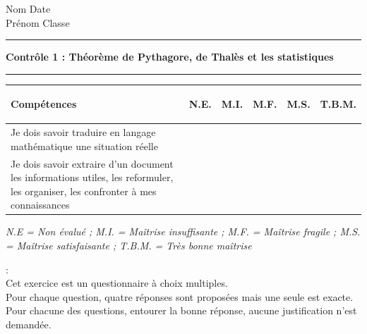 \documentclass[a4paper,11pt]{article}
\newcounter{numexo}
\newcommand{\exo}[1]{\stepcounter{numexo}\noindent{\bf Exercice~\thenumexo} : \marginpar{\hfill /#1}}
\newcommand{\titre}[5] 
{
\noindent #2 \hfill #4 \\
#3 \hfill #5

\vspace{-1.6cm}

\begin{center}\rule{6cm}{0.5mm}\end{center}
\vspace{0.2cm}
\begin{center}{\large{\textbf{#1}}}\end{center}
\begin{center}\rule{6cm}{0.5mm}\end{center}
}
\begin{document}
\pagestyle{empty}
\titre{Contrôle 1 : Théorème de Pythagore, de Thalès et les statistiques }{Nom}{Prénom}{Date}{Classe}

\begin{flushleft}
\begin{tabular}{|m{9.5cm}|m{1.25cm}|m{1.25cm}|m{1.25cm}|m{1.25cm}|m{1.25cm}|}
\hline 
\textbf{Compétences} & \begin{center}
\textbf{N.E.}
\end{center} & \begin{center}
\textbf{M.I.}
\end{center} & \begin{center}
\textbf{M.F.}
\end{center}  & \begin{center}
\textbf{M.S.}
\end{center} & \begin{center}
\textbf{T.B.M.}
\end{center} \\ 
\hline 
Je dois savoir traduire en langage mathématique une situation réelle &  &  & & &\\
\hline 
Je dois savoir extraire d'un document les informations utiles, les reformuler, les organiser, les confronter à mes connaissances &  &  & & &\\
\hline
\end{tabular} 
\end{flushleft}

\textit{N.E = Non évalué ; M.I. = Maîtrise insuffisante ; M.F. = Maîtrise fragile ; M.S. = Maîtrise satisfaisante ; T.B.M. = Très bonne maîtrise}\\


\vspace*{0.25cm}

\exo{5} \\
Cet exercice est un questionnaire à choix multiples.\\
Pour chaque question, quatre réponses sont proposées mais une seule est exacte. Pour chacune des questions, entourer la bonne réponse, aucune justification n'est demandée.\\

\vspace*{0.25cm}

\renewcommand{\arraystretch}
{3.2}
\end{document}
